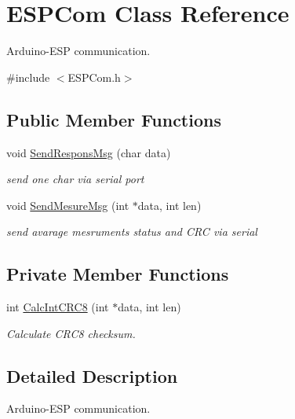 \hypertarget{class_e_s_p_com}{}\section{E\+S\+P\+Com Class Reference}
\label{class_e_s_p_com}


Arduino-\/\+E\+SP communication.  




{\ttfamily \#include $<$E\+S\+P\+Com.\+h$>$}

\subsection*{Public Member Functions}
\begin{DoxyCompactItemize}
\item 
void \hyperlink{class_e_s_p_com_adb3506c54acc4b5101fccf1204b3796c}{Send\+Respons\+Msg} (char data)
\begin{DoxyCompactList}\small\item\em send one char via serial port \end{DoxyCompactList}\item 
void \hyperlink{class_e_s_p_com_a11cf05fd9d9c7ebe9b49b18e0d2fa0ab}{Send\+Mesure\+Msg} (int $\ast$data, int len)
\begin{DoxyCompactList}\small\item\em send avarage mesruments status and C\+RC via serial \end{DoxyCompactList}\end{DoxyCompactItemize}
\subsection*{Private Member Functions}
\begin{DoxyCompactItemize}
\item 
int \hyperlink{class_e_s_p_com_a7fe56834c6cd56973666812d758bcfb9}{Calc\+Int\+C\+R\+C8} (int $\ast$data, int len)
\begin{DoxyCompactList}\small\item\em Calculate C\+R\+C8 checksum. \end{DoxyCompactList}\end{DoxyCompactItemize}


\subsection{Detailed Description}
Arduino-\/\+E\+SP communication. 

